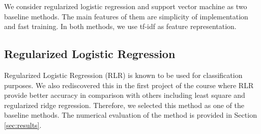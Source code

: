\documentclass[8pt,conference,compsocconf]{IEEEtran}
\begin{document}
We consider regularized logistic regression and support vector machine as two baseline methods. The main features of them are simplicity of implementation and fast training. In both methods, we use tf-idf as feature representation.

\subsection{Regularized Logistic Regression}
Regularized Logistic Regression (RLR) is known to be used for classification purposes. We also rediscovered this in the first project of the course where RLR provide better accuracy in comparison with others including least square and regularized ridge regression. Therefore, we selected this method as one of the baseline methods. The numerical evaluation of the method is provided in Section \ref{sec:results}.
\end{document}
